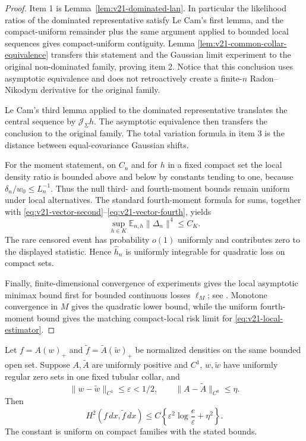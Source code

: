 \begin{proof}
Item 1 is Lemma~\ref{lem:v21-dominated-lan}.  In particular the likelihood
ratios of the dominated representative satisfy Le Cam's first lemma, and the
compact-uniform remainder plus the same argument applied to bounded local
sequences gives compact-uniform contiguity.  Lemma
\ref{lem:v21-common-collar-equivalence} transfers this statement and the
Gaussian limit experiment to the original non-dominated family, proving
item 2.  Notice that this conclusion uses asymptotic equivalence and does not
retroactively create a finite-$n$ Radon--Nikodym derivative for the original
family.

Le Cam's third lemma applied to the dominated representative translates the
central sequence by $\mathcal J_\Sigma h$.  The asymptotic equivalence then
transfers the conclusion to the original family.  The total variation
formula in item 3 is the distance between equal-covariance Gaussian shifts.

For the moment statement, on $C_n$ and for $h$ in a fixed compact set the
local density ratio is bounded above and below by constants tending to one,
because $\delta_n/w_0\le L_n^{-1}$.  Thus the null third- and fourth-moment
bounds remain uniform under local alternatives.  The standard fourth-moment
formula for sums, together with
\eqref{eq:v21-vector-second}--\eqref{eq:v21-vector-fourth}, yields
\[
 \sup_{h\in K}\mathbb E_{n,h}\|\Delta_n\|^4\le C_K.
\]
The rare censored event has probability $o(1)$ uniformly and contributes
zero to the displayed statistic.  Hence $\widehat h_n$ is uniformly
integrable for quadratic loss on compact sets.

Finally, finite-dimensional convergence of experiments gives the local
asymptotic minimax bound first for bounded continuous losses
$\ell_M$; see \cite{IbragimovHasminskii,HiranoPorter}.  Monotone convergence
in $M$ gives the quadratic lower bound, while the uniform fourth-moment bound
gives the matching compact-local risk limit for
\eqref{eq:v21-local-estimator}.
\end{proof}

\begin{lemma}
\label{lem:v21-hypersurface-stability}
Let
$f=A(w)_+$ and $\widetilde f=\widetilde A(\widetilde w)_+$ be normalized
densities on the same bounded open set.  Suppose $A,\widetilde A$ are
uniformly positive and $C^1$, $w,\widetilde w$ have uniformly regular zero
sets in one fixed tubular collar, and
\[
 \|w-\widetilde w\|_{C^1}\le\varepsilon<1/2,
 \qquad
 \|A-\widetilde A\|_{C^0}\le\eta.
\]
Then
\begin{equation}\label{eq:v21-hypersurface-stability}
 H^2(f\,dx,\widetilde f\,dx)
 \le C\left\{\varepsilon^2\log\frac e\varepsilon+\eta^2\right\}.
\end{equation}
The constant is uniform on compact families with the stated bounds.
\end{lemma}

